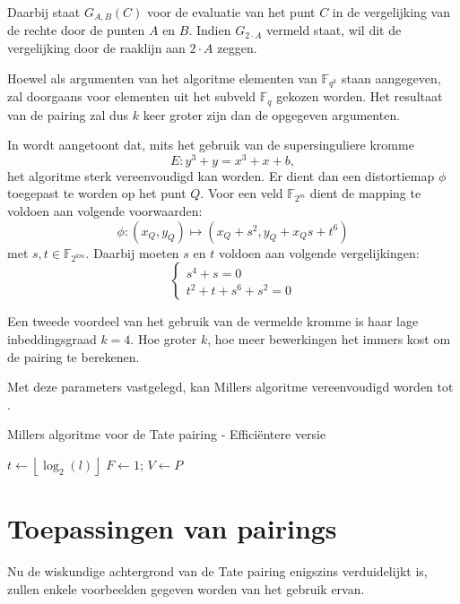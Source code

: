 Daarbij staat $G_{A, B}(C)$ voor de evaluatie van het punt $C$ in de vergelijking van de rechte door de punten $A$ en $B$. Indien $G_{2 \cdot A}$ vermeld staat, wil dit de vergelijking door de raaklijn aan $2 \cdot A$ zeggen.

Hoewel als argumenten van het algoritme elementen van $\mathbb{F}_{q^k}$ staan aangegeven, zal doorgaans voor elementen uit het subveld $\mathbb{F}_q$ gekozen worden. Het resultaat van de pairing zal dus $k$ keer groter zijn dan de opgegeven argumenten. 

In \cite{barreto-efficient} wordt aangetoont dat, mits het gebruik van de supersinguliere kromme
\[E: y^3 + y = x^3 + x + b,\]
het algoritme sterk vereenvoudigd kan worden. Er dient dan een distortiemap $\phi$ toegepast te worden op het punt $Q$. Voor een veld $\mathbb{F}_{2^m}$ dient de mapping te voldoen aan volgende voorwaarden:
\[\phi : (x_Q, y_Q) \mapsto (x_Q + s^2, y_Q + x_Q s + t^6)\]
met $s, t \in \mathbb{F}_{2^{km}}$. Daarbij moeten $s$ en $t$ voldoen aan volgende vergelijkingen:
\[\left\{\begin{array}{l}
s^4 + s = 0\\
t^2 + t + s^6 + s^2 = 0
\end{array}\right.\]

Een tweede voordeel van het gebruik van de vermelde kromme is haar lage inbeddingsgraad $k = 4$. Hoe groter $k$, hoe meer bewerkingen het immers kost om de pairing te berekenen.

Met deze parameters vastgelegd, kan Millers algoritme vereenvoudigd worden tot .

\begin{algorithm}[h]
	\caption{Millers algoritme voor de Tate pairing - Effici\"entere versie}
	\label{algoritme-pairings-miller-beter}
	$t \gets \left\lfloor \log _2 (l) \right\rfloor$\;
	$F \gets 1$; $V \gets P$\;	
\end{algorithm}

\section{Toepassingen van pairings}

Nu de wiskundige achtergrond van de Tate pairing enigszins verduidelijkt is, zullen enkele voorbeelden gegeven worden van het gebruik ervan.

